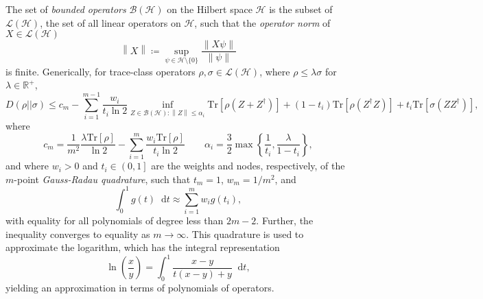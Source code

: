 \documentclass[10pt, a4paper]{article}
\numberwithin{equation}{section} %
\theoremstyle{definition}
\theoremstyle{plain}
\newcommand{\norm}[1]{\left\lVert#1\right\rVert}
\newcommand{\dif}{\mathop{}\!\mathrm{d}} %
\newcommand{\ocintv}[2]{\left(#1,#2\right]}
\newcommand{\?}{\mathrel{?}} %
\newcommand{\R}{\mathbb{R}} %
\newcommand{\Tr}{\mathrm{Tr}} %
\newcommand{\Hs}{\mathcal{H}} %
\newcommand{\sB}{\mathcal{B}}
\begin{document}
    The set of \emph{bounded operators} \(\mathcal{B}(\Hs)\) on the Hilbert space \(\Hs\) is the subset of \(\mathcal{L}(\Hs)\), the set of all linear operators on \(\Hs\), such that the \emph{operator norm} of \(X \in \mathcal{L}(\Hs)\)
      \[ \norm{X} \coloneqq \sup_{\psi \in \Hs \setminus \{0\}} \frac{\norm{X\psi}}{\norm{\psi}} \]
      is finite. Generically, for trace-class operators \(\rho, \sigma \in \mathcal{L}(\Hs)\), where \(\rho \leq \lambda\sigma\) for \(\lambda \in \R^+\),
      \begin{equation}
        D(\rho||\sigma) \leq c_m - \sum_{i=1}^{m-1} \frac{w_i}{t_i \ln 2} \inf_{Z \in \sB(\Hs) : \norm{Z} \leq \alpha_i} \Tr\left[\rho\left(Z + Z^{\dagger}\right)\right] + (1-t_i)\Tr\left[\rho\left(Z^{\dagger}Z\right)\right] + t_i\Tr\left[\sigma\left(ZZ^{\dagger}\right)\right],
      \end{equation}
      where
      \begin{equation}
        c_m = \frac{1}{m^2} \frac{\lambda \Tr[\rho]}{\ln 2} - \sum_{i=1}^m \frac{w_i \Tr[\rho]}{t_i \ln 2} \qquad \alpha_i = \frac{3}{2} \max\left\{\frac{1}{t_i}, \frac{\lambda}{1-t_i}\right\},
      \end{equation}
      and where \(w_i > 0\) and \(t_i \in \ocintv{0}{1}\) are the weights and nodes, respectively, of the \(m\)-point \emph{Gauss-Radau quadrature}, such that \(t_m = 1\), \(w_m = 1/m^2\), and
      \begin{equation}
        \int_{0}^{1} g(t) \dif{t} \approx \sum_{i=1}^m w_i g(t_i),
      \end{equation}
      with equality for all polynomials of degree less than \(2m-2\). Further, the inequality converges to equality as \(m \to \infty\). This quadrature is used to approximate the logarithm, which has the integral representation
      \begin{equation}
        \ln\left(\frac{x}{y}\right) = \int_{0}^{1} \frac{x-y}{t(x-y) + y} \dif{t},
      \end{equation}
      yielding an approximation in terms of polynomials of operators.
\end{document}

